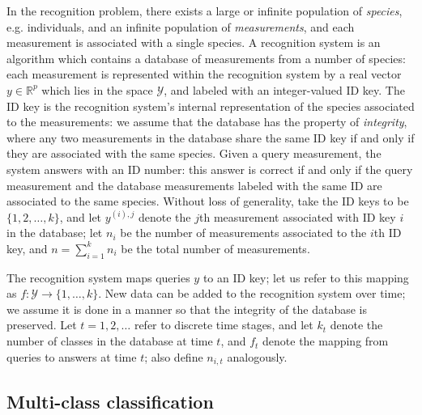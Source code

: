 \documentclass{article}
\begin{document}
In the recognition problem, there exists a large or infinite
population of \emph{species}, e.g. individuals, and an infinite
population of \emph{measurements}, and each measurement is associated
with a single species.  A recognition system is an algorithm which
contains a database of measurements from a number of species: each
measurement is represented within the recognition system by a real
vector $y \in \mathbb{R}^p$ which lies in the space $\mathcal{Y}$, and
labeled with an integer-valued ID key.  The ID key is the recognition
system's internal representation of the species associated to the
measurements: we assume that the database has the property of
\emph{integrity}, where any two measurements in the database share the
same ID key if and only if they are associated with the same species.
Given a query measurement, the system answers with an ID number: this
answer is correct if and only if the query measurement and the
database measurements labeled with the same ID are associated to the
same species.  Without loss of generality, take the ID keys to be
$\{1,2,\hdots, k\}$, and let $y^{(i), j}$ denote the $j$th measurement
associated with ID key $i$ in the database; let $n_i$ be the number of
measurements associated to the $i$th ID key, and $n = \sum_{i=1}^k
n_i$ be the total number of measurements.

The recognition system maps queries $y$ to an ID key; let us refer to
this mapping as $f:\mathcal{Y} \to \{1,\hdots, k\}$.  New data can be
added to the recognition system over time; we assume it is done in a
manner so that the integrity of the database is preserved.  Let $t =
1, 2 ,\hdots$ refer to discrete time stages, and let $k_t$ denote the
number of classes in the database at time $t$, and $f_t$ denote the
mapping from queries to answers at time $t$; also define $n_{i, t}$
analogously.

\subsection{Multi-class classification}
\end{document}
